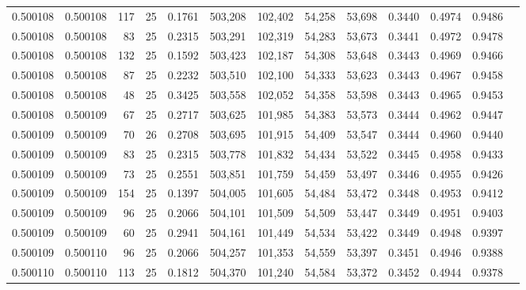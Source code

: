 \begin{tabular}{rrrrrrrrrrrrr}
0.500108 & 0.500108 &   117 &  25 &                                     0.1761 & 503,208 & 102,402 &  54,258 &  53,698 & 0.3440 & 0.4974 & 0.9486 \\
0.500108 & 0.500108 &    83 &  25 &                                     0.2315 & 503,291 & 102,319 &  54,283 &  53,673 & 0.3441 & 0.4972 & 0.9478 \\
0.500108 & 0.500108 &   132 &  25 &                                     0.1592 & 503,423 & 102,187 &  54,308 &  53,648 & 0.3443 & 0.4969 & 0.9466 \\
0.500108 & 0.500108 &    87 &  25 &                                     0.2232 & 503,510 & 102,100 &  54,333 &  53,623 & 0.3443 & 0.4967 & 0.9458 \\
0.500108 & 0.500108 &    48 &  25 &                                     0.3425 & 503,558 & 102,052 &  54,358 &  53,598 & 0.3443 & 0.4965 & 0.9453 \\
0.500108 & 0.500109 &    67 &  25 &                                     0.2717 & 503,625 & 101,985 &  54,383 &  53,573 & 0.3444 & 0.4962 & 0.9447 \\
0.500109 & 0.500109 &    70 &  26 &                                     0.2708 & 503,695 & 101,915 &  54,409 &  53,547 & 0.3444 & 0.4960 & 0.9440 \\
0.500109 & 0.500109 &    83 &  25 &                                     0.2315 & 503,778 & 101,832 &  54,434 &  53,522 & 0.3445 & 0.4958 & 0.9433 \\
0.500109 & 0.500109 &    73 &  25 &                                     0.2551 & 503,851 & 101,759 &  54,459 &  53,497 & 0.3446 & 0.4955 & 0.9426 \\
0.500109 & 0.500109 &   154 &  25 &                                     0.1397 & 504,005 & 101,605 &  54,484 &  53,472 & 0.3448 & 0.4953 & 0.9412 \\
0.500109 & 0.500109 &    96 &  25 &                                     0.2066 & 504,101 & 101,509 &  54,509 &  53,447 & 0.3449 & 0.4951 & 0.9403 \\
0.500109 & 0.500109 &    60 &  25 &                                     0.2941 & 504,161 & 101,449 &  54,534 &  53,422 & 0.3449 & 0.4948 & 0.9397 \\
0.500109 & 0.500110 &    96 &  25 &                                     0.2066 & 504,257 & 101,353 &  54,559 &  53,397 & 0.3451 & 0.4946 & 0.9388 \\
0.500110 & 0.500110 &   113 &  25 &                                     0.1812 & 504,370 & 101,240 &  54,584 &  53,372 & 0.3452 & 0.4944 & 0.9378 \\

\end{tabular}
